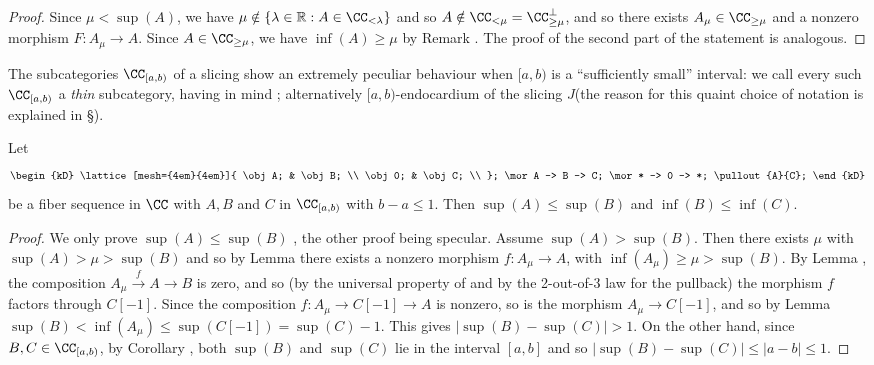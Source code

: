 \begin{proof}
Since $\mu<\sup(A)$, we have $\mu\notin\{\lambda\in \R: A\in \CC_{<\lambda}\}$ and so $A\notin \CC_{<\mu} = \CC_{\geq \mu}^\perp$, and so there exists $A_\mu\in \CC_{\geq \mu}$ and a nonzero morphism $F\colon A_\mu\to A$. Since $A\in \CC_{\geq \mu}$, we have $\inf(A)\geq \mu$ by Remark . The proof of the second part of the statement is analogous. 
\end{proof}
\begin{definition}\label{thin.subcat}
The subcategories $\cab$ of a slicing show an extremely peculiar behaviour when $[a,b)$ is a ``sufficiently small'' interval: we call every such $\cab$ a \emph{thin} subcategory, having in mind \cite[\adef \textbf{7.2}]{Brid}; alternatively $[a,b)$\hyp{}endocardium of the slicing $J$(the reason for this quaint choice of notation is explained in \S{}).
\end{definition}
\begin{lemma}\label{lem:thin_are_closed}
Let  
 \[
\begin{kD}
\lattice[mesh={4em}{4em}]{
  \obj A; & \obj B; \\
  \obj 0; & \obj C; \\
};
\mor A -> B -> C;
\mor * -> 0 -> *;
\pullout{A}{C};
\end{kD}
 \]
be a fiber sequence in $\CC$ with $A,B$ and $C$ in $\cab$ with $b-a\leq 1$. Then $\sup(A)\leq \sup(B)$ and $\inf(B)\leq \inf(C)$.
\end{lemma}
\begin{proof}
We only prove $\sup(A)\leq \sup(B)$ , the other proof being specular. Assume $\sup(A)>\sup(B)$. Then there exists $\mu$ with $\sup(A)>\mu>\sup(B)$ and so by Lemma  there exists a nonzero morphism $f\colon A_\mu\to A$, with $\inf(A_\mu)\geq \mu>\sup(B)$. By Lemma , the composition $A_\mu\xrightarrow{f} A\to B$ is zero, and so (by the universal property of and by the 2-out-of-3 law for the pullback) the morphism $f$ factors through $C[-1]$. Since the composition $f\colon A_\mu\to C[-1]\to A$ is nonzero, so is the morphism $A_\mu\to C[-1]$, and so by Lemma  $\sup(B)<\inf(A_\mu)\leq \sup(C[-1])=\sup(C)-1$. This gives $|\sup(B)-\sup(C)|>1$. On the other hand, since $B,C\in \cab$, by Corollary , both $\sup(B)$ and $\sup(C)$ lie in the interval $[a,b]$ and so $|\sup(B)-\sup(C)|\leq |a-b|\leq 1$.
\end{proof}
